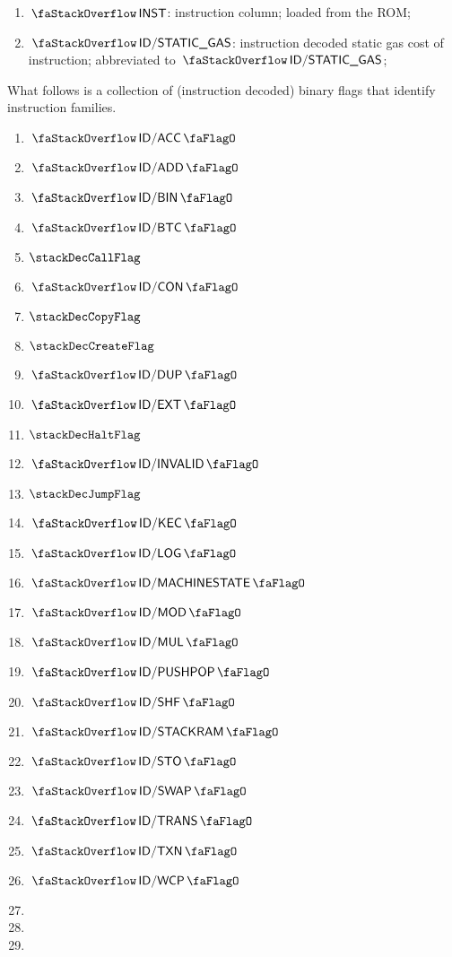\begin{enumerate}[resume]
	\item $\stackInst{}$:
		instruction column; loaded from the ROM;
	\item $\stackSTATICGAS$:
		instruction decoded static gas cost of instruction;
		abbreviated to $\stackStaticGas{}$;
\end{enumerate}
What follows is a collection of (instruction decoded) binary flags that identify instruction families.
\begin{multicols}{4}
	\begin{enumerate}[resume]
		\item $\stackDecAccFlag$
		\item $\stackDecAddFlag$
		\item $\stackDecBinFlag$
		\item $\stackDecBtcFlag$
		\item $\stackDecCallFlag$
		\item $\stackDecConFlag$
		\item $\stackDecCopyFlag$
		\item $\stackDecCreateFlag$
		\item $\stackDecDupFlag$
		\item $\stackDecExtFlag$
		\item $\stackDecHaltFlag$
		\item $\stackDecInvalidFlag$
		\item $\stackDecJumpFlag$
		\item $\stackDecKecFlag$
		\item $\stackDecLogFlag$
		\item $\stackDecMachineStateFlag$
		\item $\stackDecModFlag$
		\item $\stackDecMulFlag$
		\item $\stackDecPushPopFlag$
		\item $\stackDecShfFlag$
		\item $\stackDecStackRamFlag$
		\item $\stackDecStoFlag$
		\item $\stackDecSwapFlag$
		\item $\stackDecTransFlag$
		\item $\stackDecTxnFlag$
		\item $\stackDecWcpFlag$
		\item[\vspace{\fill}]
		\item[\vspace{\fill}]
		\item[\vspace{\fill}]
	\end{enumerate}
\end{multicols}
